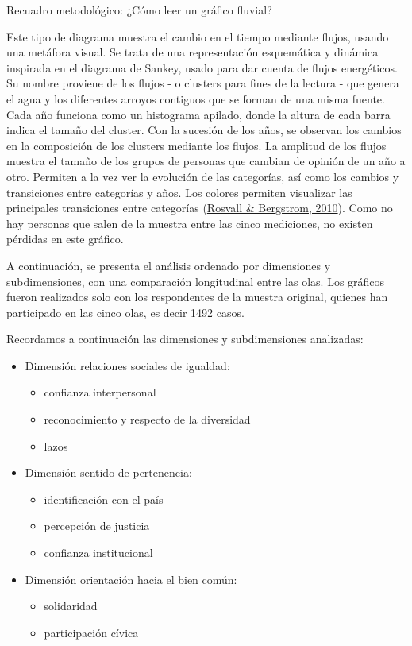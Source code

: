\documentclass[
  12pt,
]{book}
\providecommand{\tightlist}{%
  \setlength{\itemsep}{0pt}\setlength{\parskip}{0pt}}
\begin{document}
Recuadro metodológico: ¿Cómo leer un gráfico fluvial?

Este tipo de diagrama muestra el cambio en el tiempo mediante flujos, usando una metáfora visual. Se trata de una representación esquemática y dinámica inspirada en el diagrama de Sankey, usado para dar cuenta de flujos energéticos. Su nombre proviene de los flujos - o clusters para fines de la lectura - que genera el agua y los diferentes arroyos contiguos que se forman de una misma fuente. Cada año funciona como un histograma apilado, donde la altura de cada barra indica el tamaño del cluster. Con la sucesión de los años, se observan los cambios en la composición de los clusters mediante los flujos. La amplitud de los flujos muestra el tamaño de los grupos de personas que cambian de opinión de un año a otro. Permiten a la vez ver la evolución de las categorías, así como los cambios y transiciones entre categorías y años. Los colores permiten visualizar las principales transiciones entre categorías (\protect\hyperlink{ref-rosvall_mapping_2010}{Rosvall \& Bergstrom, 2010}). Como no hay personas que salen de la muestra entre las cinco mediciones, no existen pérdidas en este gráfico.

A continuación, se presenta el análisis ordenado por dimensiones y subdimensiones, con una comparación longitudinal entre las olas. Los gráficos fueron realizados solo con los respondentes de la muestra original, quienes han participado en las cinco olas, es decir 1492 casos.

Recordamos a continuación las dimensiones y subdimensiones analizadas:

\begin{itemize}
\tightlist
\item
  Dimensión relaciones sociales de igualdad:

  \begin{itemize}
  \tightlist
  \item
    confianza interpersonal
  \item
    reconocimiento y respecto de la diversidad
  \item
    lazos
  \end{itemize}
\item
  Dimensión sentido de pertenencia:

  \begin{itemize}
  \tightlist
  \item
    identificación con el país
  \item
    percepción de justicia
  \item
    confianza institucional
  \end{itemize}
\item
  Dimensión orientación hacia el bien común:

  \begin{itemize}
  \tightlist
  \item
    solidaridad
  \item
    participación cívica
  \end{itemize}
\end{itemize}
\end{document}
